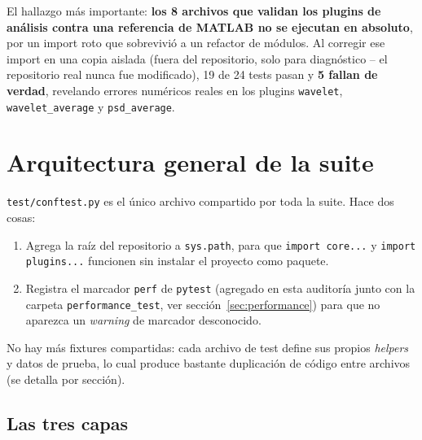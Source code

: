 \documentclass[11pt,a4paper]{article}
\begin{document}
El hallazgo más importante: \textbf{los 8 archivos que validan los plugins de análisis contra una referencia
de MATLAB no se ejecutan en absoluto}, por un import roto que sobrevivió a un refactor de módulos. Al
corregir ese import en una copia aislada (fuera del repositorio, solo para diagnóstico -- el repositorio real
nunca fue modificado), 19 de 24 tests pasan y \textbf{5 fallan de verdad}, revelando errores numéricos reales
en los plugins \texttt{wavelet}, \texttt{wavelet\_\allowbreak average} y \texttt{psd\_\allowbreak average}.

\section{Arquitectura general de la suite}

\texttt{test/conftest.py} es el único archivo compartido por toda la suite. Hace dos cosas:

\begin{enumerate}
  \item Agrega la raíz del repositorio a \texttt{sys.path}, para que \texttt{import core...} y
        \texttt{import plugins...} funcionen sin instalar el proyecto como paquete.
  \item Registra el marcador \texttt{perf} de \texttt{pytest} (agregado en esta auditoría junto con la
        carpeta \texttt{performance\_\allowbreak test}, ver sección~\ref{sec:performance}) para que no aparezca un
        \textit{warning} de marcador desconocido.
\end{enumerate}

No hay más fixtures compartidas: cada archivo de test define sus propios \textit{helpers} y datos de
prueba, lo cual produce bastante duplicación de código entre archivos (se detalla por sección).

\subsection{Las tres capas}
\end{document}

